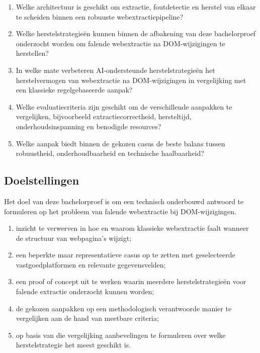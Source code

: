 \begin{enumerate}
    \item Welke architectuur is geschikt om extractie, foutdetectie en herstel van elkaar te scheiden binnen een robuuste webextractiepipeline?
    \item Welke herstelstrategieën kunnen binnen de afbakening van deze bachelorproef onderzocht worden om falende webextractie na DOM-wijzigingen te herstellen?
    \item In welke mate verbeteren AI-ondersteunde herstelstrategieën het herstelvermogen van webextractie na DOM-wijzigingen in vergelijking met een klassieke regelgebaseerde aanpak?
    \item Welke evaluatiecriteria zijn geschikt om de verschillende aanpakken te vergelijken, bijvoorbeeld extractiecorrectheid, hersteltijd, onderhoudsinspanning en benodigde resources?
    \item Welke aanpak biedt binnen de gekozen casus de beste balans tussen robuustheid, onderhoudbaarheid en technische haalbaarheid?
\end{enumerate}

\subsection{Doelstellingen}
\label{subsec:doelstellingen}

Het doel van deze bachelorproef is om een technisch onderbouwd antwoord te formuleren op het probleem van falende webextractie bij DOM-wijzigingen.

\begin{enumerate}
    \item inzicht te verwerven in hoe en waarom klassieke webextractie faalt wanneer de structuur van webpagina’s wijzigt;
    \item een beperkte maar representatieve casus op te zetten met geselecteerde vastgoedplatformen en relevante gegevensvelden;
    \item een proof of concept uit te werken waarin meerdere herstelstrategieën voor falende extractie onderzocht kunnen worden;
    \item de gekozen aanpakken op een methodologisch verantwoorde manier te vergelijken aan de hand van meetbare criteria;
    \item op basis van die vergelijking aanbevelingen te formuleren over welke herstelstrategie het meest geschikt is.
\end{enumerate}

\sloppy
